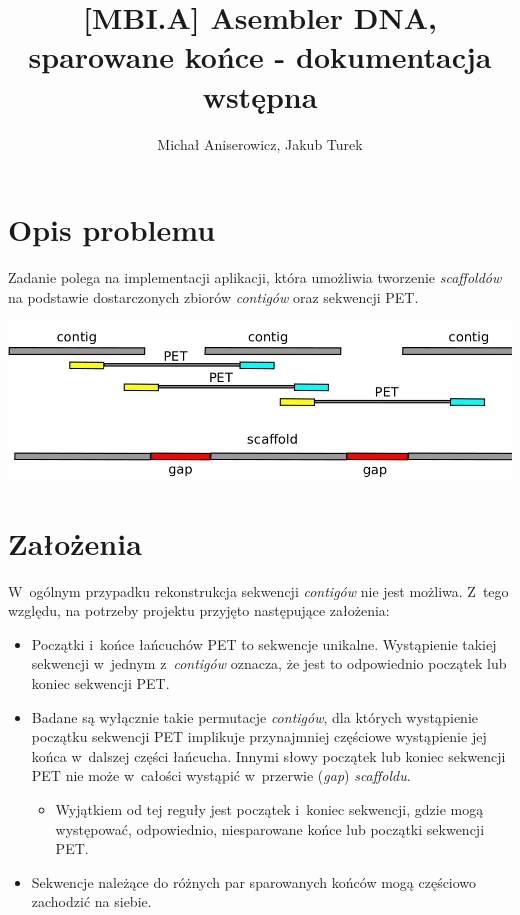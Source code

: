 \documentclass[a4paper,10pt]{article}
\title{[MBI.A] Asembler DNA, sparowane końce - dokumentacja wstępna}
\author{Michał Aniserowicz, Jakub Turek}
\date{}
\begin{document}
\maketitle

\section*{Opis problemu}

Zadanie polega na implementacji aplikacji, która umożliwia tworzenie \emph{scaffoldów} na podstawie dostarczonych zbiorów \emph{contigów} oraz sekwencji PET. 

\begin{center}
  \includegraphics[width=.9\textwidth]{contig_pet.png}
\end{center}

\section*{Założenia}

W~ogólnym przypadku rekonstrukcja sekwencji \emph{contigów} nie jest możliwa. Z~tego względu, na potrzeby projektu przyjęto następujące założenia:

\begin{itemize}
  \item Początki i~końce łańcuchów PET to sekwencje unikalne. Wystąpienie takiej sekwencji w~jednym z~\emph{contigów} oznacza, że jest to odpowiednio początek lub koniec sekwencji PET.
  \item Badane są wyłącznie takie permutacje \emph{contigów}, dla których wystąpienie początku sekwencji PET implikuje przynajmniej częściowe wystąpienie jej końca w~dalszej części łańcucha. Innymi słowy początek lub koniec sekwencji PET nie może w~całości wystąpić w~przerwie (\emph{gap}) \emph{scaffoldu}.
  
    \begin{itemize}
	  \item Wyjątkiem od tej reguły jest początek i~koniec sekwencji, gdzie mogą występować, odpowiednio, niesparowane końce lub początki sekwencji PET.
    \end{itemize}
  
  \item Sekwencje należące do różnych par sparowanych końców mogą częściowo zachodzić na siebie.
\end{itemize}
\end{document}

